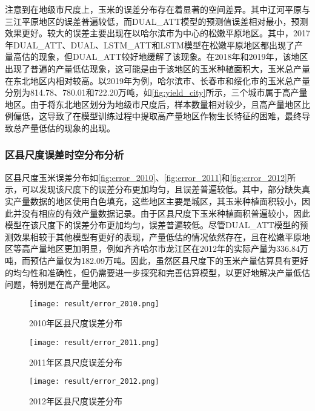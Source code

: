 \par 注意到在地级市尺度上，玉米的误差分布存在着显著的空间差异。其中辽河平原与三江平原地区的误差普遍较低，而DUAL\_ATT模型的预测值误差相对最小，预测效果更好。较大的误差主要出现在以哈尔滨市为中心的松嫩平原地区。其中，2017年DUAL\_ATT、DUAL、LSTM\_ATT和LSTM模型在松嫩平原地区都出现了产量高估的现象，但DUAL\_ATT较好地缓解了该现象。在2018年和2019年，该地区出现了普遍的产量低估现象，这可能是由于该地区的玉米种植面积大，玉米总产量在东北地区内相对较高。以2019年为例，哈尔滨市、长春市和绥化市的玉米总产量分别为814.78、780.01和722.20万吨，如\autoref{fig:yield_city}所示，三个城市属于高产量地区。由于将东北地区划分为地级市尺度后，样本数量相对较少，且高产量地区比例偏低，这导致了在模型训练过程中提取高产量地区作物生长特征的困难，最终导致总产量低估的现象的出现。

\subsubsection{区县尺度误差时空分布分析}

\par 区县尺度玉米误差分布如\autoref{fig:error_2010}、\autoref{fig:error_2011}和\autoref{fig:error_2012}所示，可以发现该尺度下的误差分布更加均匀，且误差普遍较低。其中，部分缺失真实产量数据的地区使用白色填充，这些地区主要是城区，其玉米种植面积较小，因此并没有相应的有效产量数据记录。由于区县尺度下玉米种植面积普遍较小，因此模型在该尺度下的误差分布更加均匀，误差普遍较低。尽管DUAL\_ATT模型的预测效果相较于其他模型有更好的表现，产量低估的情况依然存在，且在松嫩平原地区等高产量地区更加明显，例如齐齐哈尔市龙江区在2012年的实际产量为336.84万吨，而预估产量仅为182.09万吨。因此，虽然区县尺度下的玉米产量估算具有更好的均匀性和准确性，但仍需要进一步探究和完善估算模型，以更好地解决产量低估问题，特别是在高产量地区。

\clearpage

\begin{figure}
  \centering
  \texttt{[image: result/error\_2010.png]}
  \caption{2010年区县尺度误差分布}
  \label{fig:error_2010}
\end{figure}
\begin{figure}
  \centering
  \texttt{[image: result/error\_2011.png]}
  \caption{2011年区县尺度误差分布}
  \label{fig:error_2011}
\end{figure}
\begin{figure}
  \centering
  \texttt{[image: result/error\_2012.png]}
  \caption{2012年区县尺度误差分布}
  \label{fig:error_2012}
\end{figure}


